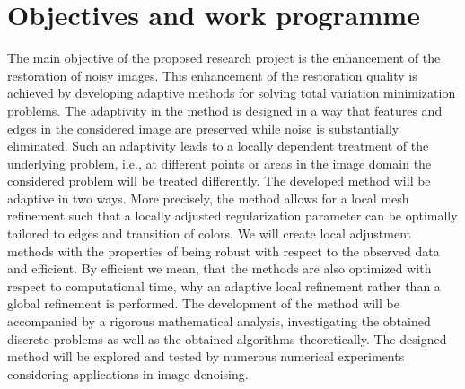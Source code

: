 \documentclass[enabledeprecatedfontcommands,cleardoublepage=empty,headsepline,twoside,11pt,DIV=15,BCOR=12mm,final]{scrartcl}
\begin{document}
\section{Objectives and work programme}
\label{sec:object}
The main objective of the proposed research project is the enhancement of the restoration of noisy images. This enhancement of the restoration quality is achieved by developing adaptive methods for solving total variation minimization problems. The adaptivity in the method is designed in a way that features and edges in the considered image are preserved while noise is substantially eliminated. Such an adaptivity leads to a locally dependent treatment of the underlying problem, i.e., at different points or areas in the image domain the considered problem will be treated differently. The developed method will be adaptive in two ways. More precisely, the method allows for a local mesh refinement such that a locally adjusted regularization parameter can be optimally tailored to edges and transition of colors. We will create local adjustment methods with the properties of being robust with respect to the observed data and efficient. By efficient we mean, that the methods are also optimized with respect to computational time, why an adaptive local refinement rather than a global refinement is performed. The development of the method will be accompanied by a rigorous mathematical analysis, investigating the obtained discrete problems as well as the obtained algorithms theoretically. The designed method will be explored and tested by numerous numerical experiments considering applications in image denoising.
\end{document}
